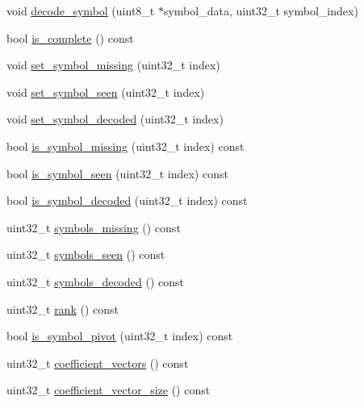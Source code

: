 \begin{DoxyCompactItemize}
\item 
void \hyperlink{group__decoder__api_ga14ba28f27d03e2eee864bc7eed6cb188}{decode\-\_\-symbol} (uint8\-\_\-t $\ast$symbol\-\_\-data, uint32\-\_\-t symbol\-\_\-index)
\item 
bool \hyperlink{group__decoder__api_gaa6d386c2d13c68f68d487bdb98d554dd}{is\-\_\-complete} () const 
\item 
void \hyperlink{group__decoder__api_ga9fb83cc2102d40006c0259088f9cb41e}{set\-\_\-symbol\-\_\-missing} (uint32\-\_\-t index)
\item 
void \hyperlink{group__decoder__api_gaf20c3a2144fa7808bfe373df00314a29}{set\-\_\-symbol\-\_\-seen} (uint32\-\_\-t index)
\item 
void \hyperlink{group__decoder__api_ga73bcee98c996a379da824eb9a79bec52}{set\-\_\-symbol\-\_\-decoded} (uint32\-\_\-t index)
\item 
bool \hyperlink{group__decoder__api_gaab2e19b7b423caddbb49b20f1adc9cc2}{is\-\_\-symbol\-\_\-missing} (uint32\-\_\-t index) const 
\item 
bool \hyperlink{group__decoder__api_ga5c012c968ab573a73b4f9e0398672633}{is\-\_\-symbol\-\_\-seen} (uint32\-\_\-t index) const 
\item 
bool \hyperlink{group__decoder__api_gae4e6fba10d31bdd30b40f80d614faa4d}{is\-\_\-symbol\-\_\-decoded} (uint32\-\_\-t index) const 
\item 
uint32\-\_\-t \hyperlink{group__decoder__api_gafdea353ad42397a2d1f992b590e0111d}{symbols\-\_\-missing} () const 
\item 
uint32\-\_\-t \hyperlink{group__decoder__api_ga75cf4d30b8f42f103a0140b0a2a65316}{symbols\-\_\-seen} () const 
\item 
uint32\-\_\-t \hyperlink{group__decoder__api_ga3a3785c55a9450955473ea46c8d7afb7}{symbols\-\_\-decoded} () const 
\item 
uint32\-\_\-t \hyperlink{group__encoder__api_ga10c217148f82a6ed036563d3542cad72}{rank} () const 
\item 
bool \hyperlink{group__encoder__api_ga72b86000f3b686b3d2791e71f4950dc6}{is\-\_\-symbol\-\_\-pivot} (uint32\-\_\-t index) const 
\item 
uint32\-\_\-t \hyperlink{group__coefficient__storage__api_gad1eec7417e960f93e39d6b12cfab1d53}{coefficient\-\_\-vectors} () const 
\item 
uint32\-\_\-t \hyperlink{group__coefficient__storage__api_gad6edd703054ca227046d4d7f827fb1f6}{coefficient\-\_\-vector\-\_\-size} () const 
\item 

\end{DoxyCompactItemize}
